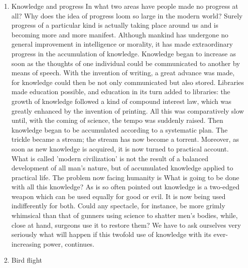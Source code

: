 \begin{enumerate}
\item         Knowledge and progress
In what two areas have people made no progress at all? Why does the idea of progress loom so large in the modern world? Surely progress of a particular kind is actually taking place around us and is becoming more and more manifest.
 Although mankind has undergone no general improvement in intelligence or morality, it has made extraordinary progress in the accumulation of knowledge.
 Knowledge began to increase as soon as the thoughts of one individual could be communicated to another by means of speech.
 With the invention of writing, a great advance was made, for knowledge could then be not only communicated but also stored.
 Libraries made education possible, and education in its turn added to libraries: the growth of knowledge followed a kind of compound interest law, which was greatly enhanced by the invention of printing.
 All this was comparatively slow until, with the coming of science, the tempo was suddenly raised.
 Then knowledge began to be accumulated according to a systematic plan.
 The trickle became a stream; the stream has now become a torrent.
 Moreover, as soon as new knowledge is acquired, it is now turned to practical account.
 What is called 'modern civilization' is not the result of a balanced development of all man's nature, but of accumulated knowledge applied to practical life.
 The problem now facing humanity is What is going to be done with all this knowledge? As is so often pointed out knowledge is a two-edged weapon which can be used equally for good or evil.
 It is now being used indifferently for both.
 Could any spectacle, for instance, be more grimly whimsical than that of gunners using science to shatter men's bodies, while, close at hand, surgeons use it to restore them? We have to ask ourselves very seriously what will happen if this twofold use of knowledge with its ever-increasing power, continues.

\item        Bird flight


\end{enumerate}
